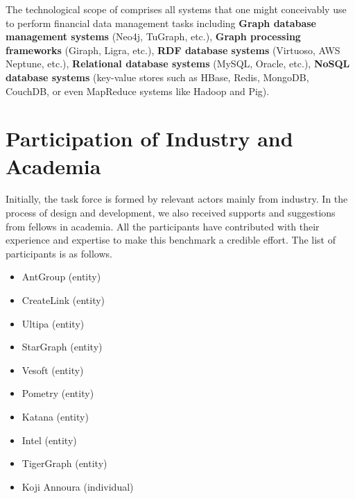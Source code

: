 The technological scope of \ldbcfinbench comprises all systems that one might
conceivably use to perform financial data management tasks including
\textbf{Graph database management systems} (\eg Neo4j, TuGraph, etc.), \textbf{
      Graph processing frameworks} (\eg Giraph, Ligra, etc.), \textbf{RDF database
      systems} (\eg Virtuoso, AWS Neptune, etc.), \textbf{Relational database systems}
(\eg MySQL, Oracle, etc.), \textbf{NoSQL database systems} (\eg key-value stores
such as HBase, Redis, MongoDB, CouchDB, or even MapReduce systems like Hadoop
and Pig).


\section{Participation of Industry and Academia}

Initially, the \ldbcfinbench task force is formed by relevant actors mainly from
industry. In the process of design and development, we also received supports and
suggestions from fellows in academia. All the participants have contributed with
their experience and expertise to make this benchmark a credible effort. The list
of participants is as follows.

\begin{itemize}
  \item AntGroup (entity)
  \item CreateLink (entity)
  \item Ultipa (entity)
  \item StarGraph (entity)
  \item Vesoft (entity)
  \item Pometry (entity)
  \item Katana (entity)
  \item Intel (entity)
  \item TigerGraph (entity)
  \item Koji Annoura (individual)
\end{itemize}


